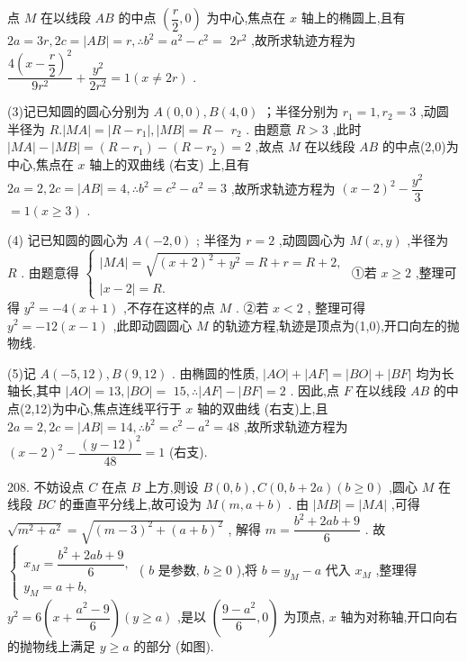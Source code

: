 点 $M$ 在以线段 ${AB}$ 的中点 $\left( {\dfrac{r}{2},0}\right)$ 为中心,焦点在 $x$ 轴上的椭圆上,且有 ${2a} = {3r},{2c} = \left| {AB}\right|  = r,\therefore {b}^{2} = {a}^{2} - {c}^{2} =$  $2{r}^{2}$ ,故所求轨迹方程为 $\dfrac{4{\left( x - \dfrac{r}{2}\right) }^{2}}{9{r}^{2}} + \dfrac{{y}^{2}}{2{r}^{2}} = 1\left( {x \neq  {2r}}\right)$ .

(3)记已知圆的圆心分别为 $A\left( {0,0}\right) ,B\left( {4,0}\right)$ ；半径分别为 ${r}_{1} = 1,{r}_{2} = 3$ ,动圆半径为 $R.\left| {MA}\right|  = \left| {R - {r}_{1}}\right| ,\left| {MB}\right|  = R -$  ${r}_{2}$ . 由题意 $R > 3$ ,此时 $\left| {MA}\right|  - \left| {MB}\right|  = \left( {R - {r}_{1}}\right)  - \left( {R - {r}_{2}}\right)  = 2$ ,故点 $M$ 在以线段 ${AB}$ 的中点(2,0)为中心,焦点在 $x$ 轴上的双曲线 (右支) 上,且有 ${2a} = 2,{2c} = \left| {AB}\right|  = 4,\therefore {b}^{2} = {c}^{2} - {a}^{2} = 3$ ,故所求轨迹方程为 ${\left( x - 2\right) }^{2} - \dfrac{{y}^{2}}{3}$  $= 1\left( {x \geq  3}\right)$ .

(4) 记已知圆的圆心为 $A\left( {-2,0}\right)$ ; 半径为 $r = 2$ ,动圆圆心为 $M\left( {x,y}\right)$ ,半径为 $R$ . 由题意得 $\left\{  \begin{array}{l} \left| {MA}\right|  = \sqrt{{\left( x + 2\right) }^{2} + {y}^{2}} = R + r = R + 2, \\  \left| {x - 2}\right|  = R. \end{array}\right.$ ①若 $x \geq  2$ ,整理可得 ${y}^{2} =  - 4\left( {x + 1}\right)$ ,不存在这样的点 $M$ . ②若 $x < 2$ , 整理可得 ${y}^{2} =  - {12}\left( {x - 1}\right)$ ,此即动圆圆心 $M$ 的轨迹方程,轨迹是顶点为(1,0),开口向左的抛物线.

(5)记 $A\left( {-5,{12}}\right) ,B\left( {9,{12}}\right)$ . 由椭圆的性质, $\left| {AO}\right|  + \left| {AF}\right|  = \left| {BO}\right|  + \left| {BF}\right|$ 均为长轴长,其中 $\left| {AO}\right|  = {13},\left| {BO}\right|  =$  ${15},\therefore \left| {AF}\right|  - \left| {BF}\right|  = 2$ . 因此,点 $F$ 在以线段 ${AB}$ 的中点(2,12)为中心,焦点连线平行于 $x$ 轴的双曲线 (右支)上,且 ${2a} = 2,{2c} = \left| {AB}\right|  = {14},\therefore {b}^{2} = {c}^{2} - {a}^{2} = {48}$ ,故所求轨迹方程为 ${\left( x - 2\right) }^{2} - \dfrac{{\left( y - {12}\right) }^{2}}{48} = 1$ (右支).

208. 不妨设点 $C$ 在点 $B$ 上方,则设 $B\left( {0,b}\right) ,C\left( {0,b + {2a}}\right) \left( {b \geq  0}\right)$ ,圆心 $M$ 在线段 ${BC}$ 的垂直平分线上,故可设为 $M\left( {m,a + b}\right)$ . 由 $\left| {MB}\right|  = \left| {MA}\right|$ ,可得 $\sqrt{{m}^{2} + {a}^{2}} = \sqrt{{\left( m - 3\right) }^{2} + {\left( a + b\right) }^{2}}$ , 解得 $m = \dfrac{{b}^{2} + {2ab} + 9}{6}$ . 故 $\left\{  \begin{array}{l} {x}_{M} = \dfrac{{b}^{2} + {2ab} + 9}{6}, \\  {y}_{M} = a + b, \end{array}\right.$ ( $b$ 是参数, $b \geq  0$ ),将 $b = {y}_{M} - a$ 代入 ${x}_{M}$ ,整理得 ${y}^{2} = 6\left( {x + \dfrac{{a}^{2} - 9}{6}}\right) \left( {y \geq  a}\right)$ ,是以 $\left( {\dfrac{9 - {a}^{2}}{6},0}\right)$ 为顶点, $x$ 轴为对称轴,开口向右的抛物线上满足 $y \geq  a$ 的部分 (如图).

